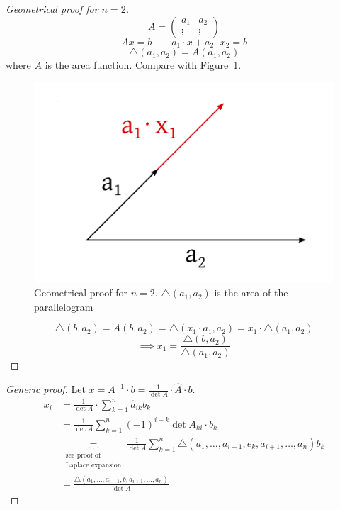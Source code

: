 \documentclass[a4paper]{article}
\numberwithin{lecref}{section}
\begin{document}
\begin{proof}[Geometrical proof for $n=2$]
  \[ A = \begin{pmatrix} a_1 & a_2 \\ \vdots & \vdots \end{pmatrix} \]
  \[ Ax = b \qquad a_1 \cdot x + a_2 \cdot x_2 = b \]
  \[ \triangle (a_1, a_2) = A(a_1, a_2) \]
  where $A$ is the area function. Compare with Figure~\ref{img:geomn2}.

  \begin{figure}[h]
    \includegraphics{img/02b_geometrical_proof_for_n2.pdf}
    \caption{Geometrical proof for $n=2$. $\triangle(a_1, a_2)$ is the area of the parallelogram}
    \label{img:geomn2}
  \end{figure}

  \[ \triangle(b, a_2) = A(b, a_2) = \triangle(x_1 \cdot a_1, a_2) = x_1 \cdot \triangle(a_1, a_2) \]
  \[ \implies x_1 = \frac{\triangle (b, a_2)}{\triangle (a_1, a_2)} \]
\end{proof}

\begin{proof}[Generic proof]
  Let $x = A^{-1} \cdot b = \frac{1}{\det{A}} \cdot \hat{A} \cdot b$.
  \begin{align*}
    x_i &= \frac{1}{\det{A}} \cdot \sum_{k=1}^n \hat{a}_{ik} b_k \\
        &= \frac{1}{\det{A}} \sum_{k=1}^n (-1)^{i+k} \det{A_{ki}} \cdot b_k \\
        &\underbrace{=}_{\substack{\text{see proof of} \\ \text{Laplace expansion}}} \frac{1}{\det{A}} \sum_{k=1}^n \triangle(a_1, \dots, a_{i-1}, e_k, a_{i+1}, \dots, a_n) b_k \\
        &= \frac{\triangle(a_1, \dots, a_{i-1}, b, a_{i+1}, \dots, a_n)}{\det{A}}
  \end{align*}
\end{proof}
\end{document}
